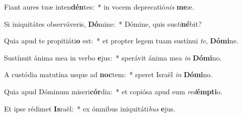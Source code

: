 \item Fiant aures tuæ inten\textbf{dén}tes:~* in vocem deprecatió\textit{nis} \textbf{me}æ.
\item Si iniquitátes observáveris, \textbf{Dó}mine:~* Dómine, quis sus\textit{ti}\textbf{né}bit?
\item Quia apud te propitiáti\textbf{o} est:~* et propter legem tuam sustínui \textit{te}, \textbf{Dó}\textbf{mi}ne.
\item Sustínuit ánima mea in verbo \textbf{e}jus:~* sperávit ánima mea \textit{in} \textbf{Dó}\textbf{mi}no.
\item A custódia matutína usque ad \textbf{noc}tem:~* speret Israël \textit{in} \textbf{Dó}\textbf{mi}no.
\item Quia apud Dóminum miseri\textbf{cór}dia:~* et copiósa apud eum \textit{red}\textbf{émp}\textbf{ti}o.
\item Et ipse rédimet \textbf{Is}raël:~* ex ómnibus iniquitáti\textit{bus} \textbf{e}jus.

